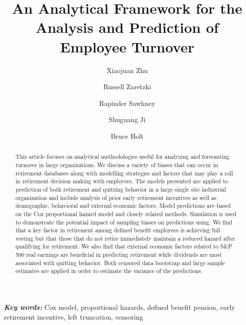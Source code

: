 \documentclass[12pt,letterpaper]{article}
\title{An Analytical Framework for the Analysis and Prediction of Employee Turnover}
\author[1]{Xiaojuan Zhu}
\author[2]{Russell Zaretzki}
\author[1]{Rapinder Sawhney}
\author[1]{Shuguang Ji}
\author[3]{Bruce Holt}
\affil[1]{Industrial \& Systems Engineering, University of Tennessee, Knoxville}
\affil[2]{Business Analytics \& Statistics, University of Tennessee, Knoxville}
\affil[3]{Y-12 National Security Complex}
\providecommand{\keywords}[1]{\textbf{\textit{Key words:}} #1} %
\begin{document}
\maketitle

\begin{abstract}
This article focuses on analytical methodologies useful for analyzing and forecasting turnover in large organizations.  We discuss a variety of biases that can occur in retirement databases along with modelling strategies and factors that may play a roll in retirement decision making with employees. The models presented are applied to prediction of both retirement and quitting behavior in a large single site industrial organization and include analysis of prior early retirement incentives as well as demographic, behavioral and external economic factors. Model predictions are based on the Cox proportional hazard model and closely related methods. Simulation is used to demonstrate the potential impact of sampling biases on predictions using. We find that a key factor in retirement among defined benefit employees is achieving full vesting but that those that do not retire immediately maintain a reduced hazard after qualifying for retirement. We also find that external economic factors related to S\&P 500 real earnings are beneficial in predicting retirement while dividends are most associated with quitting behavior.  Both censored data bootstrap and large sample estimates are applied in order to estimate the variance of the predictions.

\end{abstract}

\keywords {Cox model, proportional hazards, defined benefit pension, early retirement incentive, left truncation, censoring}


\end{document}
